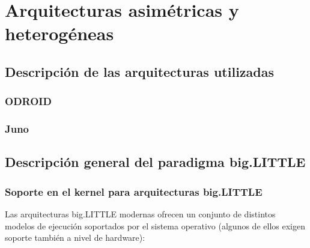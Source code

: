\cleardoublepage

\chapter{Arquitecturas asimétricas y heterogéneas}
\label{ch:chapter2}

\section{Descripción de las arquitecturas utilizadas}

\subsection{ODROID}

\subsection{Juno}

\section{Descripción general del paradigma big.LITTLE}

\subsection{Soporte en el kernel para arquitecturas big.LITTLE}

Las arquitecturas big.LITTLE modernas ofrecen un conjunto de distintos modelos de ejecución
soportados por el sistema operativo (algunos de ellos exigen soporte también a nivel de
hardware):

